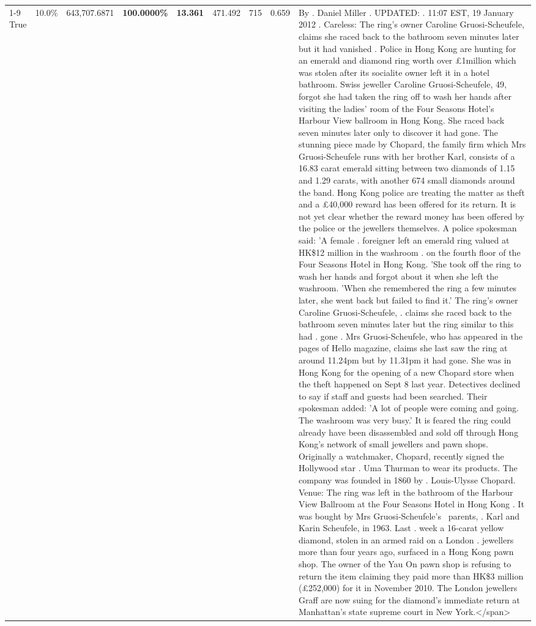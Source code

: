 \begin{table}[H]
\begin{tabular}{lllrlllll}
\cline{1-9}
True & 10.0\% & 643,707.6871 & \bfseries \color{red} 100.0000\% & \bfseries \color{red} 13.361 & 471.492 & 715 & 0.659 & By . Daniel Miller . UPDATED: . 11:07 EST, 19 January 2012 . Careless: The ring's owner Caroline Gruosi-Scheufele, claims she raced back to the bathroom seven minutes later but it had vanished . Police in Hong Kong are hunting for an emerald and diamond ring worth over £1million which was stolen after its socialite owner left it in a hotel bathroom. Swiss jeweller Caroline Gruosi-Scheufele, 49, forgot she had taken the ring off to wash her hands after visiting the ladies' room of the Four Seasons Hotel's Harbour View ballroom in Hong Kong. She raced back seven minutes later only to discover it had gone. The stunning piece made by Chopard, the family firm which Mrs Gruosi-Scheufele runs with her brother Karl, consists of a 16.83 carat emerald sitting between two diamonds of 1.15 and 1.29 carats, with another 674 small diamonds around the band. Hong Kong police are treating the matter as theft and a £40,000 reward has been offered for its return. It is not yet clear whether the reward money has been offered by the police or the jewellers themselves. A police spokesman said: 'A female . foreigner left an emerald ring valued at HK\$12 million in the washroom . on the fourth floor of the Four Seasons Hotel in Hong Kong. 'She took off the ring to wash her hands and forgot about it when she left the washroom. 'When she remembered the ring a few minutes later, she went back but failed to find it.' The ring's owner Caroline Gruosi-Scheufele, . claims she raced back to the bathroom seven minutes later but the ring similar to this had . gone . Mrs Gruosi-Scheufele, who has appeared in the pages of Hello magazine, claims she last saw the ring at around 11.24pm but by 11.31pm it had gone. She was in Hong Kong for the opening of a new Chopard store when the theft happened on Sept 8 last year. Detectives declined to say if staff and guests had been searched. Their spokesman added: 'A lot of people were coming and going. The washroom was very busy.' It is feared the ring could already have been disassembled and sold off through Hong Kong's network of small jewellers and pawn shops. Originally a watchmaker, Chopard, recently signed the Hollywood star . Uma Thurman to wear its products. The company was founded in 1860 by . Louis-Ulysse Chopard. Venue: The ring was left in the bathroom of the Harbour View Ballroom at the Four Seasons Hotel in Hong Kong . It was bought by Mrs Gruosi-Scheufele's  parents, . Karl and Karin Scheufele, in 1963. Last . week a 16-carat yellow diamond, stolen in an armed raid on a London . jewellers more than four years ago, surfaced in a Hong Kong pawn shop. The owner of the Yau On pawn shop is refusing to return the item claiming they paid more than HK\$3 million (£252,000) for it in November 2010. The London jewellers Graff are now suing for the diamond’s immediate return at Manhattan’s state supreme court in New York.</span> \\

\end{tabular}
\end{table}
